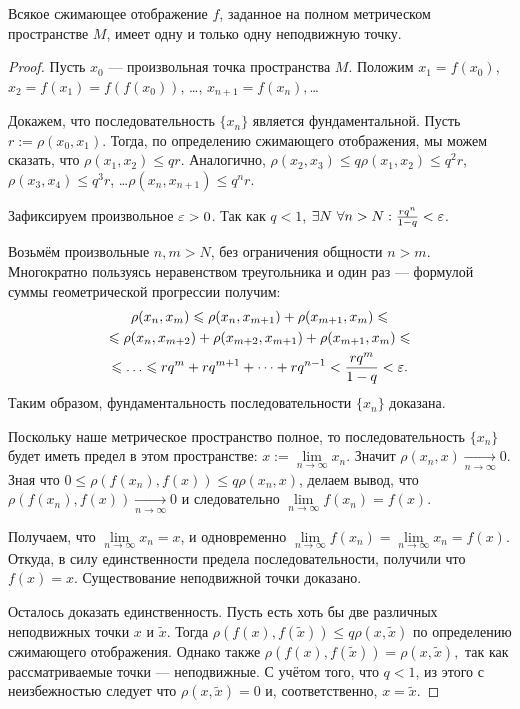 \begin{Theorem}
  Всякое сжимающее отображение $f$, заданное на полном метрическом пространстве $M$, имеет одну и только одну неподвижную точку.
\end{Theorem}
\begin{proof}

Пусть $x_0$ --- произвольная точка пространства $M$. Положим $x_1 = f(x_0) $, $x_2 = f(x_1) = f(f(x_0))$, \dots, $x_{n+1} = f(x_{n}),$\dots

Докажем, что последовательность  $\{ x_n \} $ является фундаментальной.
Пусть $r := \rho(x_0, x_1)$.  Тогда, по определению сжимающего отображения, мы можем сказать, что  $\rho(x_1, x_2) \leq qr$. Аналогично, $\rho(x_2, x_3) \leq q \rho(x_1, x_2) \leq q^2r $, $\rho(x_3, x_4) \leq q^3r $, \dots  $\rho(x_{n}, x_{n+1}) \leq q^nr$.

Зафиксируем произвольное $\varepsilon>0$. 
Так как  $q < 1 $, $\exists N\ \forall n>N: \frac{rq^n}{1-q} < \varepsilon$.

Возьмём произвольные $n, m >N$, без ограничения общности $n>m$.
Многократно пользуясь неравенством треугольника и один раз --- формулой суммы геометрической прогрессии получим:
\begin{multline}\rho(x_n, x_m) \leq \rho(x_n, x_{m+1})+\rho(x_{m+1}, x_m)\leq\\ \leq \rho(x_n, x_{m+2})+ \rho(x_{m+2}, x_{m+1})+\rho(x_{m+1}, x_m) \leq\\\leq \dots\leq rq^{m} + rq^{m+1}+\dots+rq^{n-1} < \frac{rq^m}{1-q} < \eps .\end{multline}	
Таким образом, фундаментальность последовательности  $\{ x_n \} $ доказана. 


Поскольку наше метрическое пространство полное, то последовательность $\{ x_n \}$ будет иметь предел в этом пространстве: $x:= \lim\limits_{n \to \infty}x_n$.
Значит $\rho(x_{n}, x) \xrightarrow[n \to\infty]{} 0$. Зная что $0\leq\rho(f(x_{n}), f(x))\leq q \rho(x_{n}, x)$, делаем вывод, что $\rho(f(x_{n}), f(x)) \xrightarrow[n \to\infty]{} 0$ и следовательно $\lim\limits_{n \to \infty}f(x_n) = f(x)$.

Получаем, что  $\lim\limits_{n \to \infty}x_n = x$, и одновременно $\lim\limits_{n \to \infty}f(x_n) = \lim\limits_{n \to \infty}x_n= f(x)$. Откуда, в силу единственности предела последовательности, получили что $f(x) = x$.
Существование неподвижной точки доказано.


Осталось доказать единственность. 
Пусть есть хоть бы две различных неподвижных точки $x$ и $\tilde{x}$.
Тогда $\rho(f(x), f(\tilde{x})) \leq q\rho(x, \tilde{x})$ по определению сжимающего отображения. Однако также $\rho(f(x), f(\tilde{x})) = \rho(x, \tilde{x}),$ так как рассматриваемые точки --- неподвижные. С учётом того, что $q<1$, из этого с неизбежностью следует что $\rho(x, \tilde{x}) = 0$ и, соответственно, $x = \tilde{x}$.

\end{proof}

